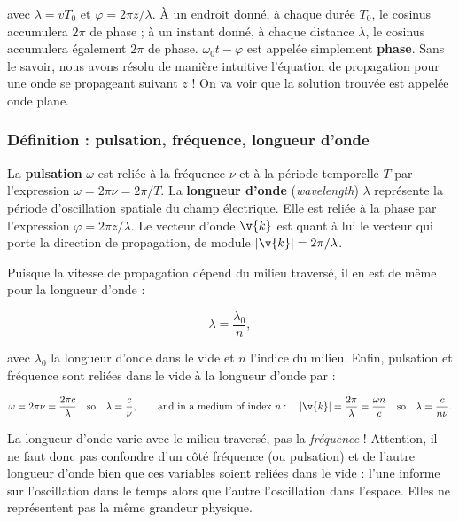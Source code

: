 avec $\lambda=vT_0$ et $\varphi=2\pi z/\lambda$. À un endroit donné, à chaque
durée $T_0$, le cosinus accumulera $2\pi$ de phase ; à un instant donné, à chaque
distance $\lambda$, le cosinus accumulera également $2\pi$ de phase.
$\omega_0t-\varphi$ est appelée simplement \textbf{phase}. Sans le savoir, nous
avons résolu de manière intuitive l'équation de propagation pour une onde se
propageant suivant $z$ ! On va voir que la solution trouvée est appelée onde
plane.

\subsubsection{Définition : pulsation, fréquence, longueur d'onde}

\begin{definition}
  La \textbf{pulsation} $\omega$ est reliée à la fréquence $\nu$ et à la
  période temporelle $T$ par l'expression $\omega=2\pi\nu=2\pi/T$. La
  \textbf{longueur d'onde} (\textit{wavelength}) $\lambda$ représente la
  période d'oscillation spatiale du champ électrique. Elle est reliée à la
  phase par l'expression $\varphi=2\pi z/\lambda$. Le vecteur d'onde $\v{k}$
  est quant à lui le vecteur qui porte la direction de propagation, de module
  $|\v{k}|=2\pi/\lambda$.
\end{definition}

Puisque la vitesse de propagation dépend du milieu traversé, il en est de même
pour la longueur d'onde :

\[
  \lambda=\frac{\lambda_0}{n},
\]

avec $\lambda_0$ la longueur d'onde dans le vide et $n$ l'indice du milieu.
Enfin, pulsation et fréquence sont reliées dans le vide à la longueur d'onde
par :

\[
  \omega=2\pi\nu=\frac{2\pi c}{\lambda}
  \quad\text{so}\quad \lambda=\frac{c}{\nu},
  \qquad\text{and in a medium of index }n:\quad
  |\v{k}|=\frac{2\pi}{\lambda}=\frac{\omega n}{c}
  \quad\text{so}\quad \lambda=\frac{c}{n\nu}.
\]

\begin{remark}
  La longueur d'onde varie avec le milieu traversé, pas la \emph{fréquence} !
  Attention, il ne faut donc pas confondre d'un côté fréquence (ou pulsation)
  et de l'autre longueur d'onde bien que ces variables soient reliées dans le
  vide : l'une informe sur l'oscillation dans le temps alors que l'autre
  l'oscillation dans l'espace. Elles ne représentent pas la même grandeur
  physique.
\end{remark}

